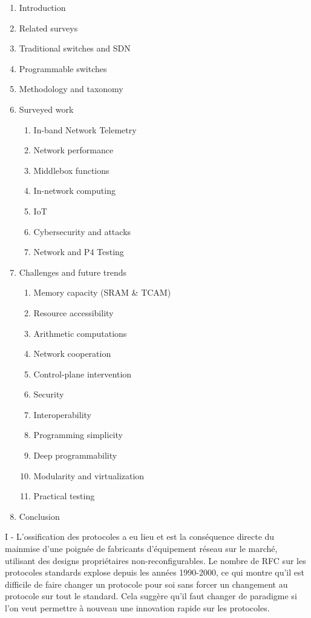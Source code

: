\begin{enumerate}
	\item Introduction
	\item Related surveys
	\item Traditional switches and SDN
	\item Programmable switches
	\item Methodology and taxonomy
	\item Surveyed work
	\begin{enumerate}
		\item In-band Network Telemetry
		\item Network performance
		\item Middlebox functions
		\item In-network computing
		\item IoT
		\item Cybersecurity and attacks
		\item Network and P4 Testing
	\end{enumerate}
	\item Challenges and future trends
	\begin{enumerate}
		\item Memory capacity (SRAM \& TCAM)
		\item Resource accessibility
		\item Arithmetic computations
		\item Network cooperation
		\item Control-plane intervention
		\item Security
		\item Interoperability
		\item Programming simplicity
		\item Deep programmability
		\item Modularity and virtualization
		\item Practical testing
	\end{enumerate}
	\item Conclusion
\end{enumerate}


I - L'ossification des protocoles a eu lieu et est la conséquence directe du mainmise d'une poignée de fabricants d'équipement réseau sur le marché, utilisant des designs propriétaires non-reconfigurables. Le nombre de RFC sur les protocoles standards explose depuis les années 1990-2000, ce qui montre qu'il est difficile de faire changer un protocole pour soi sans forcer un changement au protocole sur tout le standard. Cela suggère qu'il faut changer de paradigme si l'on veut permettre à nouveau une innovation rapide sur les protocoles.

